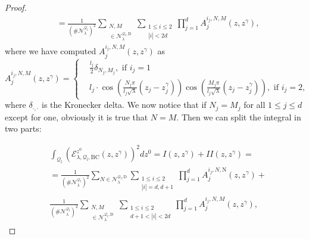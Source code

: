 \documentclass{amsart}
\theoremstyle{definition}
\theoremstyle{remark}
\renewcommand\leq\leqslant
\numberwithin{equation}{section}
\theoremstyle{definition}
\theoremstyle{remark}
\begin{document}
\begin{proof}
\begin{equation}
\begin{aligned}
			&=\frac{1}{\left(\#\mathcal{N}_\lambda^{\mathcal{Q}_l}\right)^2}\sum_{\substack{N,M\\ \in\mathcal{N}_\lambda^{\mathcal{Q}_l,\mathrm{D}}}}\sum_{\substack{1\leq i\leq 2\\|i|<2d}} \prod_{j=1}^d A_j^{i_j,N,M}(z,z^\gamma),
		\end{aligned}
	\end{equation}where we have computed $A_j^{i_j,N,M}(z,z^\gamma)$ as
	\begin{equation}
		A_j^{i_j,N,M}(z,z^\gamma)=\left\{\begin{aligned}
			&\frac{l_j}{2}\delta_{N_j,M_j},\text{ if }i_j=1\\
			&l_j\cdot\cos\left(\frac{N_j\pi}{l_j\sqrt{\lambda}}(z_j-z^\gamma_j)\right)\cos\left(\frac{M_j\pi}{l_j\sqrt{\lambda}}(z_j-z^\gamma_j)\right),\text{ if }i_j=2,
		\end{aligned}
		\right.
	\end{equation}
	where $\delta_{\cdot,\cdot}$ is the Kronecker delta. We now notice that if $N_j=M_j$ for all $1\leq j\leq d$ except for one, obviously it is true that $N=M$.
	Then we can split the integral in two parts:
    
	\begin{equation}
		\begin{aligned}
			&\int_{\mathcal{Q}_l}\left(\mathcal{E}_{\lambda,\mathcal{Q}_l,\mathrm{BC}}^{z^0}(z,z^\gamma)\right)^2dz^0=I(z,z^\gamma)+II(z,z^\gamma)=\\
			&=\frac{1}{\left(\#\mathcal{N}_\lambda^{\mathcal{Q}_l}\right)^2}\sum_{N\in\mathcal{N}_\lambda^{\mathcal{Q}_l,\mathrm{D}}}\sum_{\substack{1\leq i\leq 2\\|i|=d, d+1}} \prod_{j=1}^d A_j^{i_j,N,\mathrm{N}}(z,z^\gamma)+\\&\frac{1}{\left(\#\mathcal{N}_\lambda^{\mathcal{Q}_l}\right)^2}\sum_{\substack{N,M\\ \in\mathcal{N}_\lambda^{\mathcal{Q}_l,\mathrm{D}}}}\sum_{\substack{1\leq i\leq 2\\d+1<|i|<2d}} \prod_{j=1}^d A_j^{i_j,N,M}(z,z^\gamma),
		\end{aligned}
	\end{equation}
	

\end{proof}
\end{document}
